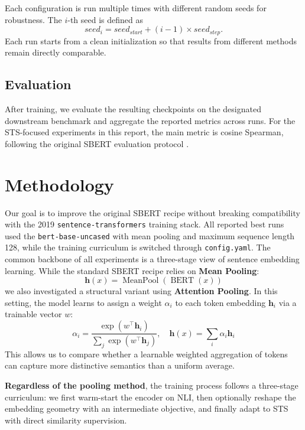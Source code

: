 \documentclass[letterpaper]{article} %
\begin{document}
Each configuration is run multiple times with different random seeds for robustness. The $i$-th seed
is defined as
\begin{equation}
    seed_i = seed_{start} + (i-1) \times seed_{step} .
\end{equation}
Each run starts from a clean initialization so that results from different methods remain directly
comparable.

\subsection{Evaluation}
After training, we evaluate the resulting checkpoints on the designated downstream benchmark and
aggregate the reported metrics across runs. For the STS-focused experiments in this report, the main
metric is cosine Spearman, following the original SBERT evaluation protocol
\cite{reimers-gurevych-2019-sentence-bert}.

\section{Methodology}
Our goal is to improve the original SBERT recipe without breaking compatibility with the 2019
\texttt{sentence-transformers} training stack. All reported best runs used the \texttt{bert-base-uncased} 
with mean pooling and maximum sequence length 128,
while the training curriculum is switched through \texttt{config.yaml}. 
The common backbone of all experiments is a three-stage view of sentence embedding learning. While the standard SBERT recipe relies on \textbf{Mean Pooling}:
\begin{equation}
\mathbf{h}(x)=\operatorname{MeanPool}(\operatorname{BERT}(x))
\end{equation}
we also investigated a structural variant using \textbf{Attention Pooling}. In this setting, the model learns to assign a weight $\alpha_i$ to each token embedding $\mathbf{h}_i$ via a trainable vector $w$:
\begin{equation}
\alpha_i = \frac{\exp(w^\top \mathbf{h}_i)}{\sum_j \exp(w^\top \mathbf{h}_j)}, \quad \mathbf{h}(x) = \sum_i \alpha_i \mathbf{h}_i
\end{equation}
This allows us to compare whether a learnable weighted aggregation of tokens can capture more distinctive semantics than a uniform average. 

\textbf{Regardless of the pooling method}, the training process follows a three-stage curriculum: we first warm-start the encoder on NLI, then optionally reshape the embedding geometry with an intermediate objective, and finally adapt to STS with direct similarity supervision.
\end{document}
